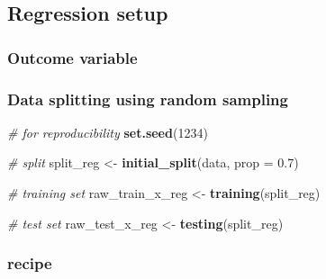 \documentclass[
]{book}
\newenvironment{Shaded}{\begin{snugshade}}{\end{snugshade}}
\newcommand{\AttributeTok}[1]{\textcolor[rgb]{0.13,0.29,0.53}{#1}}
\newcommand{\CommentTok}[1]{\textcolor[rgb]{0.56,0.35,0.01}{\textit{#1}}}
\newcommand{\DecValTok}[1]{\textcolor[rgb]{0.00,0.00,0.81}{#1}}
\newcommand{\FloatTok}[1]{\textcolor[rgb]{0.00,0.00,0.81}{#1}}
\newcommand{\FunctionTok}[1]{\textcolor[rgb]{0.13,0.29,0.53}{\textbf{#1}}}
\newcommand{\NormalTok}[1]{#1}
\newcommand{\OtherTok}[1]{\textcolor[rgb]{0.56,0.35,0.01}{#1}}
\newcommand{\SpecialCharTok}[1]{\textcolor[rgb]{0.81,0.36,0.00}{\textbf{#1}}}
\begin{document}
\subsection{Regression setup}\label{regression-setup}

\subsubsection{Outcome variable}\label{outcome-variable}

\begin{Shaded}
\end{Shaded}

\subsubsection{Data splitting using random sampling}\label{data-splitting-using-random-sampling}

\begin{Shaded}
\begin{Highlighting}[]
\CommentTok{\# for reproducibility}
\FunctionTok{set.seed}\NormalTok{(}\DecValTok{1234}\NormalTok{)}

\CommentTok{\# split}
\NormalTok{split\_reg }\OtherTok{\textless{}{-}} \FunctionTok{initial\_split}\NormalTok{(data, }\AttributeTok{prop =} \FloatTok{0.7}\NormalTok{)}

\CommentTok{\# training set}
\NormalTok{raw\_train\_x\_reg }\OtherTok{\textless{}{-}} \FunctionTok{training}\NormalTok{(split\_reg)}

\CommentTok{\# test set}
\NormalTok{raw\_test\_x\_reg }\OtherTok{\textless{}{-}} \FunctionTok{testing}\NormalTok{(split\_reg)}
\end{Highlighting}
\end{Shaded}

\subsubsection{recipe}\label{recipe}
\end{document}
